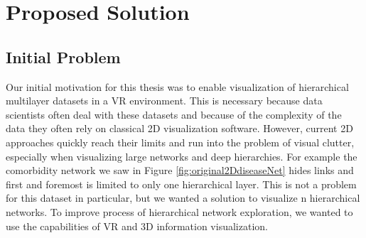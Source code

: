 \chapter{Proposed Solution}

\section{Initial Problem}

Our initial motivation for this thesis was to enable visualization of hierarchical multilayer datasets in a VR environment. 
This is necessary because data scientists often deal with these datasets and because of the complexity of the data they often rely on classical 2D visualization software.
However, current 2D approaches quickly reach their limits and run into the problem of visual clutter, especially when visualizing large networks and deep hierarchies. For example the comorbidity network we saw in Figure \ref{fig:original2DdiseaseNet} hides links and first and foremost is limited to only one hierarchical layer. This is not a problem for this dataset in particular, but we wanted a solution to visualize n hierarchical networks.
To improve process of hierarchical network exploration, we wanted to use the capabilities of VR and 3D information visualization. 

